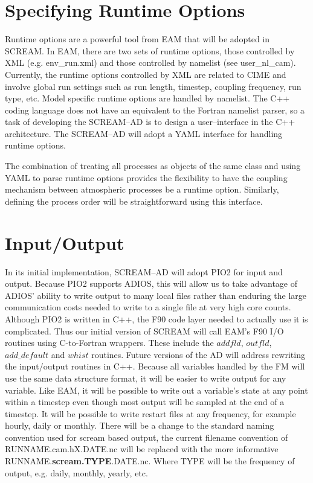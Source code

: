 \documentclass[10pt]{article}
\begin{document}
\section{Specifying Runtime Options}
\label{sec:run_config}

Runtime options are a powerful tool from EAM that will be adopted in SCREAM.  In EAM, there are two sets of runtime options, those controlled by XML (e.g. env\_run.xml) and those controlled by namelist (see user\_nl\_cam).  Currently, the runtime options controlled by XML are related to CIME and involve global run settings such as run length, timestep, coupling frequency, run type, etc.  Model specific runtime options are handled by namelist.  The C++ coding language does not have an equivalent to the Fortran namelist parser, so a task of developing the SCREAM--AD is to design a user--interface in the C++ architecture.  The SCREAM--AD will adopt a YAML interface for handling runtime options.  

The combination of treating all processes as objects of the same class and using YAML to parse runtime options provides the flexibility to have the coupling mechanism between atmospheric processes be a runtime option.  Similarly, defining the process order will be straightforward using this interface.  

\section{Input/Output}
\label{sec:similarities}

In its initial implementation, SCREAM--AD will adopt PIO2 for input and output. Because PIO2 supports ADIOS, this will allow us to take advantage of ADIOS' ability to write output to many local files rather than enduring the large communication costs needed to write to a single file at very high core counts.  Although PIO2 is written in C++, the F90 code layer needed to actually use it is complicated. Thus our initial version of SCREAM will call EAM's F90 I/O routines using C-to-Fortran wrappers.  These include the $addfld$, $outfld$, $add\_default$ and $whist$ routines.  Future versions of the AD will address rewriting the input/output routines in C++.  Because all variables handled by the FM will use the same data structure format, it will be easier to write output for any variable.  Like EAM, it will be possible to write out a variable's state at any point within a timestep even though most output will be sampled at the end of a timestep.  It will be possible to write restart files at any frequency, for example hourly, daily or monthly.  There will be a change to the standard naming convention used for scream based output, the current filename convention of RUNNAME.cam.hX.DATE.nc will be replaced with the more informative RUNNAME.{\bf scream.TYPE}.DATE.nc.  Where TYPE will be the frequency of output, e.g. daily, monthly, yearly, etc.
\end{document}
